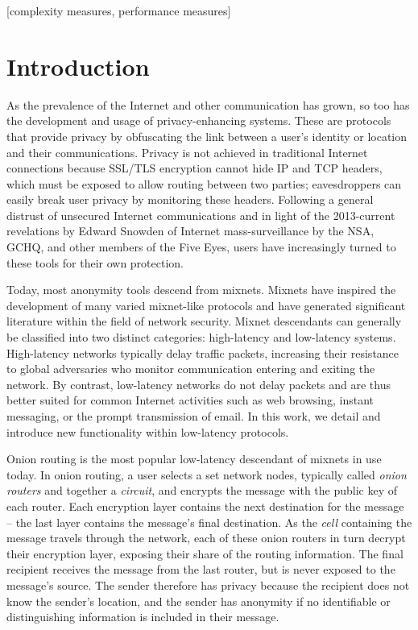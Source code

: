 \documentclass{sig-alternate}
\begin{document}
[complexity measures, performance measures]

\section{Introduction}

As the prevalence of the Internet and other communication has grown, so too has the development and usage of privacy-enhancing systems. These are protocols that provide privacy by obfuscating the link between a user's identity or location and their communications. Privacy is not achieved in traditional Internet connections because SSL/TLS encryption cannot hide IP and TCP headers, which must be exposed to allow routing between two parties; eavesdroppers can easily break user privacy by monitoring these headers.\cite{miller2014know} Following a general distrust of unsecured Internet communications and in light of the 2013-current revelations by Edward Snowden of Internet mass-surveillance by the NSA, GCHQ, and other members of the Five Eyes, users have increasingly turned to these tools for their own protection.

Today, most anonymity tools descend from mixnets.\cite{chaum2003untraceable} Mixnets have inspired the development of many varied mixnet-like protocols and have generated significant literature within the field of network security.\cite{edman2009anonymity} Mixnet descendants can generally be classified into two distinct categories: high-latency and low-latency systems. High-latency networks typically delay traffic packets, increasing their resistance to global adversaries who monitor communication entering and exiting the network. By contrast, low-latency networks do not delay packets and are thus better suited for common Internet activities such as web browsing, instant messaging, or the prompt transmission of email.\cite{dingledine2004tor} In this work, we detail and introduce new functionality within low-latency protocols.

Onion routing\cite{syverson1997anonymous}\cite{reed1998anonymous} is the most popular low-latency descendant of mixnets in use today. In onion routing, a user selects a set network nodes, typically called \emph{onion routers} and together a \emph{circuit}, and encrypts the message with the public key of each router. Each encryption layer contains the next destination for the message -- the last layer contains the message's final destination. As the \emph{cell} containing the message travels through the network, each of these onion routers in turn decrypt their encryption layer, exposing their share of the routing information. The final recipient receives the message from the last router, but is never exposed to the message's source. The sender therefore has privacy because the recipient does not know the sender's location, and the sender has anonymity if no identifiable or distinguishing information is included in their message.
\end{document}
